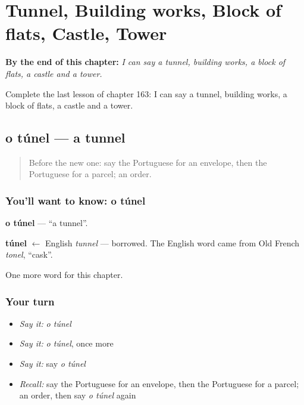 
\chapter{Tunnel, Building works, Block of flats, Castle, Tower}
\label{ch:pt-tunnel-building-works-block-of-flats-castle-tower}

\begin{chapteropening}
\textbf{By the end of this chapter:} \emph{I can say a tunnel, building works, a block of flats, a castle and a tower.}

Complete the last lesson of chapter 163: I can say a tunnel, building works, a block of flats, a castle and a tower.
\end{chapteropening}

\section[o túnel]{o túnel — a tunnel}

\label{lesson:PT-C163-tunel}



\begin{quote}
Before the new one: say the Portuguese for an envelope, then the Portuguese for a parcel; an order.
\end{quote}

\subsection*{You'll want to know: o túnel}
\textbf{o túnel} — \textquotedblleft{}a tunnel\textquotedblright{}.

\begin{cousinweb}
\textbf{túnel} $\leftarrow$ English \emph{tunnel} — borrowed. The English word came from Old French \emph{tonel}, \textquotedblleft{}cask\textquotedblright{}.
\end{cousinweb}

\begin{grammarlens}[title={What you've built}]
One more word for this chapter.
\end{grammarlens}

\subsection*{Your turn}
\begin{itemize}
\raggedright
  \item \emph{Say it:} \emph{o túnel}
  \item \emph{Say it:} \emph{o túnel}, once more
  \item \emph{Say it:} say \emph{o túnel}
  \item \emph{Recall:} say the Portuguese for an envelope, then the Portuguese for a parcel; an order, then say \emph{o túnel} again
\end{itemize}

